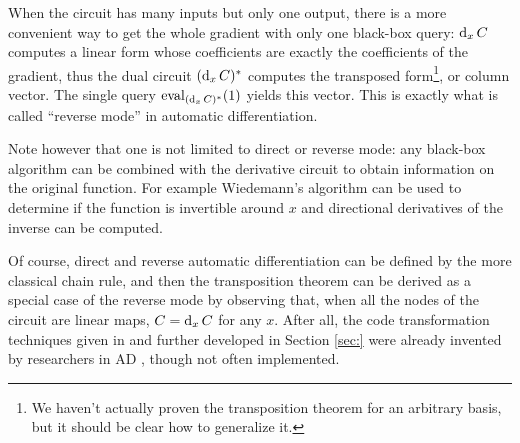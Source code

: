 When the circuit has many inputs but only one output, there is a more
convenient way to get the whole gradient with only one black-box
query: $\operatorname{d}_xC$ computes a linear form whose coefficients are
exactly the coefficients of the gradient, thus the dual circuit
$(\operatorname{d}_xC)^\ast$ computes the transposed form\footnote{We haven't
  actually proven the transposition theorem for an arbitrary basis,
  but it should be clear how to generalize it.}, or column vector. The
single query $\operatorname{eval}_{(\operatorname{d}_xC)^\ast}(1)$ yields this vector. This
is exactly what is called ``reverse mode'' in automatic
differentiation.

Note however that one is not limited to direct or reverse mode: any
black-box algorithm can be combined with the derivative circuit to
obtain information on the original function. For example Wiedemann's
algorithm \cite{Wie86} can be used to determine if the function is
invertible around $x$ and directional derivatives of the inverse can
be computed.

Of course, direct and reverse automatic differentiation can be defined
by the more classical chain rule, and then the transposition theorem
can be derived as a special case of the reverse mode by observing
that, when all the nodes of the circuit are linear maps, $C=\operatorname{d}_xC$
for any $x$. After all, the code transformation techniques given in
\cite{BoLeSc03} and further developed in Section \ref{sec:} were
already invented by researchers in AD \cite{GVM91}, though not often
implemented. 

